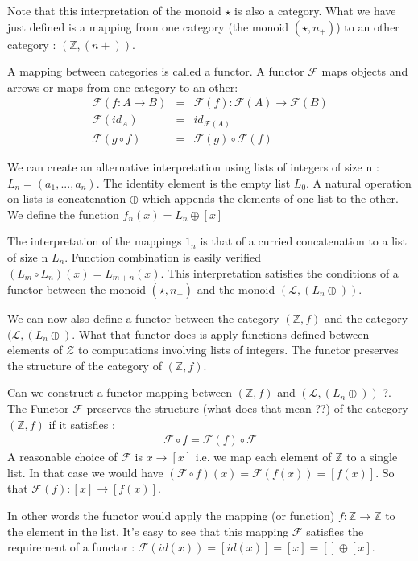 \documentclass[12pt,fleqn]{article}
\begin{document}
Note that this interpretation of the monoid $\star$ is also a category. 
What we have just defined is a mapping from one category (the monoid $(\star, n_+)$) to an other category : $(\mathbb{Z}, (n +))$.

A mapping between categories is called a functor. 
A functor $\mathcal{F}$ maps objects and arrows or maps from one category to an other:
\begin{eqnarray*}
\mathcal{F} (f : A \rightarrow B) &=& \mathcal{F}(f) : \mathcal{F}(A) \rightarrow \mathcal{F}(B) \\
\mathcal{F}(id_A) &=& id_{\mathcal{F}(A)} \\
\mathcal{F}(g \circ f) &=& \mathcal{F}(g) \circ \mathcal{F}(f)
\end{eqnarray*}


We can create an alternative interpretation using lists of integers of size n : $L_{n} = (a_1,...,a_{n})$. 
The identity element is the empty list $L_0$.
A natural operation on lists is concatenation $\oplus$ which appends the elements of one list to the other.
We define the function $f_{n} (x) = L_{n} \oplus [x]$

The interpretation of the mappings $1_n$ is that of a curried concatenation to a list of size n $L_{n}$.
Function combination is easily verified $(L_m \circ L_n)(x) = L_{m+n} (x)$.
This interpretation satisfies the conditions of a functor between the monoid $(\star, n_+)$ and the monoid $(\mathcal{L},(L_n \oplus ))$.

We can now also define a functor between the category $(\mathbb{Z}, f)$ and the category $(\mathcal{L}, (L_n \oplus)$.
What that functor does is apply functions defined between elements of $\mathcal{Z}$ to computations involving lists of integers.
The functor preserves the structure of the category of $(\mathbb{Z}, f)$.

Can we construct a functor mapping between $(\mathbb{Z}, f)$ and $(\mathcal{L}, (L_n \oplus ))$ ?.
The Functor $\mathcal{F}$ preserves the structure (what does that mean ??) of the category $(\mathbb{Z}, f)$ if it satisfies :
\begin{eqnarray*}
\mathcal{F} \circ f = \mathcal{F}(f) \circ \mathcal{F} 
\end{eqnarray*}
A reasonable choice of $\mathcal{F}$ is $x \rightarrow [x]$ i.e. we map each element of $\mathbb{Z}$ to a single list.
In that case we would have $(\mathcal{F} \circ f)(x) = \mathcal{F}(f(x)) = [f(x)]$.
So that $\mathcal{F}(f) : [x] \rightarrow [f(x)]$.

In other words the functor would apply the mapping (or function) $f : \mathbb{Z} \rightarrow \mathbb{Z}$ to the element in the list.
It's easy to see that this mapping $\mathcal{F}$ satisfies the requirement of a functor : $\mathcal{F} (id(x)) = [id(x)] = [x] = [] \oplus [x]$.
\end{document}
